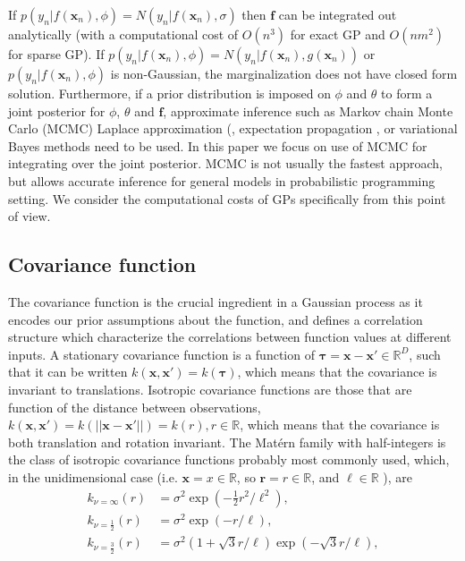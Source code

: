 \documentclass[]{interact}
\theoremstyle{plain}%
\theoremstyle{definition}
\theoremstyle{remark}
\begin{document}
If $p(y_n|f(\mathbf{x}_n),\phi)=N(y_n|f(\mathbf{x}_n),\sigma)$ then $\mathbf{f}$ can be integrated out analytically (with a computational cost of $O(n^3)$ for exact GP and $O(nm^2)$ for sparse GP). If $p(y_n|f(\mathbf{x}_n),\phi)=N(y_n|f(\mathbf{x}_n),g(\mathbf{x}_n))$ or $p(y_n|f(\mathbf{x}_n),\phi)$ is non-Gaussian, the marginalization does not have closed form solution.
%
Furthermore, if a prior distribution is imposed on $\phi$ and $\theta$ to form a joint posterior for $\phi$, $\theta$ and $\mathbf{f}$,
approximate inference such as Markov chain Monte Carlo (MCMC) \citep{brooks_2011} Laplace approximation (\citep{williams1998bayesian,rasmussen2006gaussian}, expectation propagation \citep{minka2001expectation}, or variational Bayes methods \citep{gibbs2000variational,csato2000efficient} need to be used.
%
In this paper we focus on use of MCMC for integrating over the joint
posterior. MCMC is not usually the fastest approach, but allows
accurate inference for general models in probabilistic programming
setting. We consider the computational costs of GPs specifically from
this point of view.

\subsection{Covariance function}

The covariance function is the crucial ingredient in a Gaussian process as it encodes our prior assumptions about the function, and defines a correlation structure which characterize the correlations between function values at different inputs. A stationary covariance function is a function of $\bm{\tau}=\mathbf{x}-\mathbf{x}' \in \mathbb{R}^D$, such that it can be written $k(\mathbf{x},\mathbf{x}') = k(\bm{\tau})$, which means that the covariance is invariant to translations. Isotropic covariance functions are those that are function of the distance between observations, $k(\mathbf{x},\mathbf{x}') = k(||\mathbf{x}-\mathbf{x}'||) = k(r), r\in \mathbb{R}$, which means that the covariance is both translation and rotation invariant. The Mat\'ern family with half-integers is the class of isotropic covariance functions probably most commonly used, which, in the unidimensional case (i.e. $\mathbf{x}=x\in \mathbb{R}$, so $\mathbf{r}=r\in \mathbb{R}$, and $\ell\in \mathbb{R}$ ), are
%
\begin{align*}
k_{\nu=\infty}(r)&=\sigma^2 \exp(-\frac{1}{2} r^2/\ell^2), \\
k_{\nu=\frac{1}{2}}(r)&=\sigma^2 \exp(-r/\ell),  \\
k_{\nu=\frac{3}{2}}(r)&=\sigma^2(1+\sqrt{3}r/\ell) \exp(-\sqrt{3}r/\ell), 
\end{align*}
\end{document}
